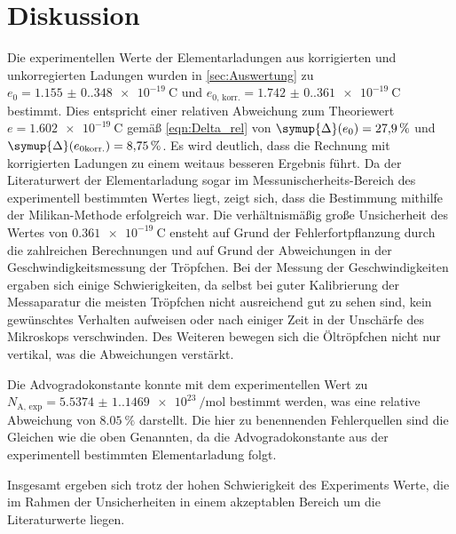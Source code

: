 \section{Diskussion}
\label{sec:Diskussion}
Die experimentellen Werte der Elementarladungen aus korrigierten und unkorregierten Ladungen wurden in \autoref{sec:Auswertung} zu 
$e_0 = \qty{1.155(0.348)e-19}{\coulomb}$ und $e_{0 \text{, korr.}} = \qty{1.742(0.361)e-19}{\coulomb}$ bestimmt. Dies entspricht einer
relativen Abweichung zum Theoriewert $e = \qty{1.602e-19}{\coulomb}$ \cite{Ingenieurwissen} gemäß \autoref{eqn:Delta_rel} von $\symup{\Delta}(e_0) = \qty{27.9}{\percent}$ und 
$\symup{\Delta}(e_{0 \text{korr.}}) = \qty{8.75}{\percent}$. Es wird deutlich, dass die Rechnung mit korrigierten Ladungen zu einem weitaus besseren Ergebnis führt. 
Da der Literaturwert der Elementarladung sogar im Messunischerheits-Bereich des experimentell bestimmten Wertes liegt, zeigt sich, dass die Bestimmung mithilfe der 
Milikan-Methode erfolgreich war. Die verhältnismäßig große Unsicherheit des Wertes von $\qty{0.361e-19}{\coulomb}$ ensteht auf Grund der Fehlerfortpflanzung durch
die zahlreichen Berechnungen und auf Grund der Abweichungen in der Geschwindigkeitsmessung der Tröpfchen. Bei der Messung der Geschwindigkeiten ergaben sich einige
Schwierigkeiten, da selbst bei guter Kalibrierung der Messaparatur die meisten Tröpfchen nicht ausreichend gut zu sehen sind, kein gewünschtes Verhalten aufweisen 
oder nach einiger Zeit in der Unschärfe des Mikroskops verschwinden. Des Weiteren bewegen sich die Öltröpfchen nicht nur vertikal, was die Abweichungen verstärkt.

Die Advogradokonstante konnte mit dem experimentellen Wert zu $N_\text{A, exp} = \qty{5.5374(1.1469)e23}{\per\mol}$ bestimmt werden, was eine relative Abweichung
von $\qty{8.05}{\percent}$ darstellt. Die hier zu benennenden Fehlerquellen sind die Gleichen wie die oben Genannten, da die Advogradokonstante aus der
experimentell bestimmten Elementarladung folgt.

Insgesamt ergeben sich trotz der hohen Schwierigkeit des Experiments Werte, die im Rahmen der Unsicherheiten in einem akzeptablen Bereich um die Literaturwerte
liegen.
